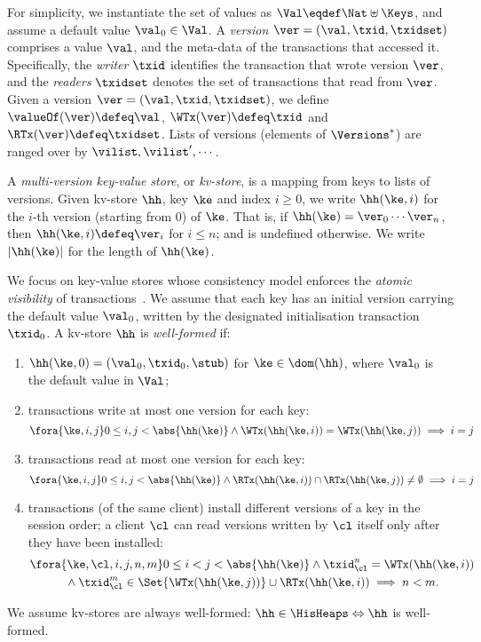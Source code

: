 For simplicity, we instantiate the set of values as  $\Val \eqdef \Nat \uplus \Keys$,
and assume a default value $\val_0 \in \Val$. 
A \emph{version} $\ver = (\val, \txid, \txidset)$ comprises a value $\val$,
and the meta-data of the transactions that accessed it.
Specifically, the \emph{writer} $\txid$ identifies the transaction that wrote version $\ver$, 
and the \emph{readers} $\txidset$ denotes the set of transactions that read from $\ver$.
Given a version $\ver = (\val, \txid, \txidset)$, we define $\valueOf(\ver) \defeq \val$,
$\WTx(\ver) \defeq \txid$ and $\RTx(\ver) \defeq \txidset$.
Lists of versions (\ie elements of $\Versions^{\ast}$) are ranged over by $\vilist, \vilist',\cdots$.

A \emph{multi-version key-value store}, or \emph{kv-store}, 
is a mapping from keys to lists of versions. 
Given kv-store $\hh$, key $\ke$ and index $i \geq 0$, 
we write $\hh(\ke, i)$ for the $i$-th version (starting from $0$) of $\ke$.
That is, if $\hh(\ke) = \ver_0 \cdots\ver_{n}$, then $\hh(\ke, i) \defeq \ver_{i}$ for $i \leq n$; 
and is undefined otherwise. 
We write $\lvert \hh(\ke) \rvert$ for the length of $\hh(\ke)$.

We focus on key-value stores whose consistency model enforces the \emph{atomic visibility} of transactions~\cite{framework-concur}. 
We assume that each key has an initial version carrying the default value $\val_0$, 
written by the designated initialisation transaction $\txid_0$.
A kv-store $\hh$ is \emph{well-formed} if:
\begin{enumerate}%
\item\label{kv:wf.init} 
    $\hh(\ke, 0) = (\val_0, \txid_0, \stub)$ for $\ke \in \dom(\hh)$, where $\val_0$ is the default value in $\Val$;
\item\label{kv:wf.onewrite} 
    transactions write at most one version for each key:
\[
\fora{\ke, i,j }
0 \leq i, j < \abs{ \hh(\ke) }
\land \WTx(\hh(\ke, i)) = \WTx(\hh(\ke, j))
\implies i = j 
\]
\item\label{kv:wf.oneread} 
    transactions read at most one version for each key:
\[
\fora{\ke, i,j } 
0 \leq i, j < \abs{ \hh(\ke) }
\land \RTx(\hh(\ke, i)) \cap \RTx(\hh(\ke, j)) \neq \emptyset 
\implies i = j
\]
\item\label{kv:wf.so} 
	transactions (of the same client) install different versions of a key in the session order; 
    a client $\cl$ can read versions written by $\cl$ itself only after they have been installed:
\begin{multline*}
    \fora{ \ke, \cl, i,j, n, m} 
    0 \leq i < j < \abs{\hh(\ke)} 
    \land \txid_{\cl}^{n} = \WTx(\hh(\ke,i)) \\
    {} \wedge \txid_{\cl}^{m} \in \Set{\WTx(\hh(\ke,j))} \cup \RTx(\hh(\ke, i))
    \implies n < m.
\end{multline*}
\end{enumerate}
%
We assume kv-stores are always well-formed: $\hh \in \HisHeaps \Leftrightarrow \hh$  is well-formed.

